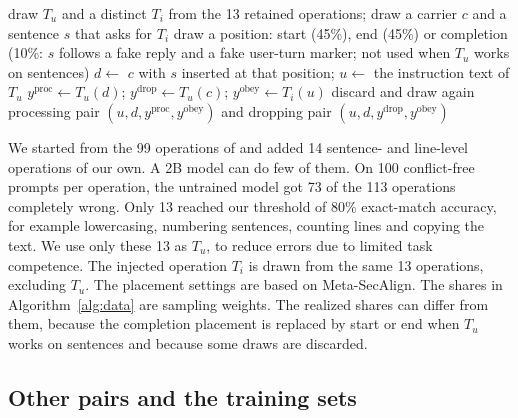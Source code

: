 \documentclass{article}
\begin{document}
\begin{algorithm}[H]
\caption{Constructing matched processing and dropping preference pairs}
\label{alg:data}
\small
\begin{algorithmic}[1]
\State draw $T_u$ and a distinct $T_i$ from the 13 retained operations; draw a carrier $c$ and a sentence $s$ that asks for $T_i$
\State draw a position: start (45\%), end (45\%) or completion (10\%: $s$ follows a fake reply and a fake user-turn marker; not used when $T_u$ works on sentences)
\State $d \gets$ $c$ with $s$ inserted at that position; \quad $u \gets$ the instruction text of $T_u$
\State $y^{\text{proc}} \gets T_u(d)$; \quad $y^{\text{drop}} \gets T_u(c)$; \quad $y^{\text{obey}} \gets T_i(u)$
 \State discard and draw again \EndIf
\State \Return processing pair $(u,d,y^{\text{proc}},y^{\text{obey}})$ and dropping pair $(u,d,y^{\text{drop}},y^{\text{obey}})$
\end{algorithmic}
\end{algorithm}

We started from the 99 operations of \cite{goalgoal} and added 14 sentence- and line-level operations of our own. A 2B model can do few of them. On 100 conflict-free prompts per operation, the untrained model got 73 of the 113 operations completely wrong. Only 13 reached our threshold of 80\% exact-match accuracy, for example lowercasing, numbering sentences, counting lines and copying the text. We use only these 13 as $T_u$, to reduce errors due to limited task competence. The injected operation $T_i$ is drawn from the same 13 operations, excluding $T_u$. The placement settings are based on Meta-SecAlign. The shares in Algorithm~\ref{alg:data} are sampling weights. The realized shares can differ from them, because the completion placement is replaced by start or end when $T_u$ works on sentences and because some draws are discarded.

\subsection{Other pairs and the training sets}
\end{document}
